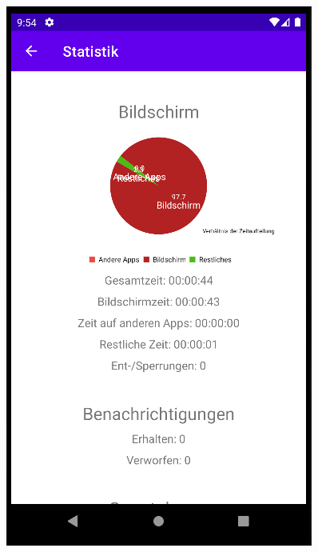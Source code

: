 \documentclass{article}
\begin{document}
\begin{center}
    \includegraphics[scale=0.45]{stats_session_1.png}
\end{center}
\end{document}
